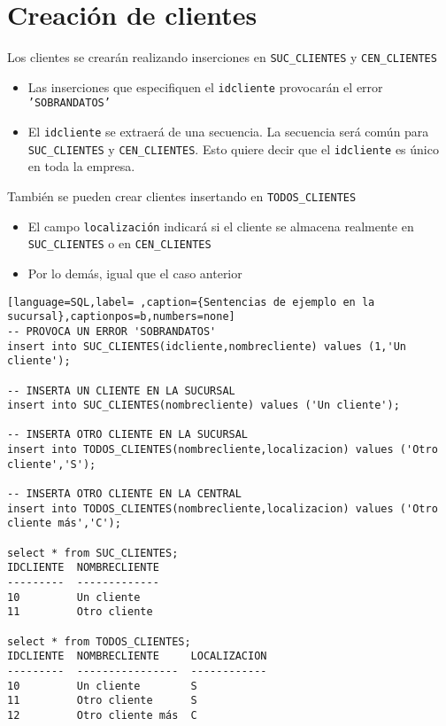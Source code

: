 \documentclass[a4paper]{article}
\begin{document}
\newpage
\section{Creación de clientes}
\label{sec:org0000012}
Los clientes se crearán realizando inserciones en \texttt{SUC\_CLIENTES} y \texttt{CEN\_CLIENTES}
\begin{itemize}
\item Las inserciones que especifiquen el \texttt{idcliente} provocarán el error \texttt{'SOBRANDATOS'}
\item El \texttt{idcliente} se extraerá de una secuencia. La secuencia será común para \texttt{SUC\_CLIENTES} y \texttt{CEN\_CLIENTES}. Esto quiere decir que el \texttt{idcliente} es único en toda la empresa.
\end{itemize}
También se pueden crear clientes insertando en \texttt{TODOS\_CLIENTES}
\begin{itemize}
\item El campo \texttt{localización} indicará si el cliente se almacena realmente en \texttt{SUC\_CLIENTES} o en \texttt{CEN\_CLIENTES}
\item Por lo demás, igual que el caso anterior
\end{itemize}



\begin{lstlisting}[language=SQL,label= ,caption={Sentencias de ejemplo en la sucursal},captionpos=b,numbers=none]
-- PROVOCA UN ERROR 'SOBRANDATOS'
insert into SUC_CLIENTES(idcliente,nombrecliente) values (1,'Un cliente');

-- INSERTA UN CLIENTE EN LA SUCURSAL
insert into SUC_CLIENTES(nombrecliente) values ('Un cliente');

-- INSERTA OTRO CLIENTE EN LA SUCURSAL
insert into TODOS_CLIENTES(nombrecliente,localizacion) values ('Otro cliente','S');

-- INSERTA OTRO CLIENTE EN LA CENTRAL
insert into TODOS_CLIENTES(nombrecliente,localizacion) values ('Otro cliente más','C');

select * from SUC_CLIENTES;
IDCLIENTE  NOMBRECLIENTE
---------  -------------
10         Un cliente
11         Otro cliente

select * from TODOS_CLIENTES;
IDCLIENTE  NOMBRECLIENTE     LOCALIZACION
---------  ----------------  ------------
10         Un cliente        S
11         Otro cliente      S
12         Otro cliente más  C
\end{lstlisting}
\end{document}
